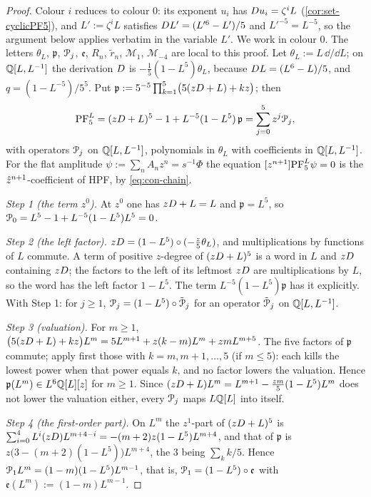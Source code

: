 \begin{proof}
Colour $i$ reduces to colour $0$: its exponent $u_i$ has $D u_i=\zeta^iL$ (\cref{cor:set-cyclicPF5}), and $L':=\zeta^iL$ satisfies $D L'=(L'^6-L')/5$ and $L'^{-5}=L^{-5}$, so the argument below applies verbatim in the variable $L'$. We work in colour $0$. The letters $\theta_L$, $\mathfrak p$, $\mathcal{P}_j$, $\mathfrak e$, $R_n$, $\tilde r_n$, $\mathcal M_1$, $\mathcal M_{-4}$ are local to this proof. Let $\theta_L:=L\,\dd/\dd L$; on $\mathbb{Q}[L,L^{-1}]$ the derivation $D$ is $-\frac15(1-L^5)\theta_L$, because $D L=(L^6-L)/5$, and $q=(1-L^{-5})/5^5$. Put $\mathfrak p:=5^{-5}\prod_{k=1}^5\bigl(5(zD+L)+kz\bigr)$; then
\begin{equation}
\label{eq:con-PL}
\mathrm{PF}_{5}^{L}=(zD+L)^5-1+L^{-5}(1-L^5)\,\mathfrak p=\sum_{j=0}^{5}z^j\mathcal{P}_j ,
\end{equation}
with operators $\mathcal{P}_j$ on $\mathbb{Q}[L,L^{-1}]$, polynomials in $\theta_L$ with coefficients in $\mathbb{Q}[L,L^{-1}]$. For the flat amplitude $\psi:=\sum_nA_nz^n=s^{-1}\Phi$ the equation $[z^{n+1}]\mathrm{PF}_{5}^{L}\psi=0$ is the $\hat{z}^{n+1}$-coefficient of HPF, by \eqref{eq:con-chain}.

\emph{Step 1 (the term $z^0$).} At $z^0$ one has $zD+L=L$ and $\mathfrak p=L^5$, so $\mathcal{P}_0=L^5-1+L^{-5}(1-L^5)L^5=0$.

\emph{Step 2 (the left factor).} $zD=(1-L^5)\circ(-\tfrac z5\theta_L)$, and multiplications by functions of $L$ commute. A term of positive $z$-degree of $(zD+L)^5$ is a word in $L$ and $zD$ containing $zD$; the factors to the left of its leftmost $zD$ are multiplications by $L$, so the word has the left factor $1-L^5$. The term $L^{-5}(1-L^5)\mathfrak p$ has it explicitly. With Step 1: for $j\geq1$, $\mathcal{P}_j=(1-L^5)\circ\tilde{\mathcal{P}}_j$ for an operator $\tilde{\mathcal{P}}_j$ on $\mathbb{Q}[L,L^{-1}]$.

\emph{Step 3 (valuation).} For $m\geq1$, $\bigl(5(zD+L)+kz\bigr)L^m=5L^{m+1}+z(k-m)L^m+zmL^{m+5}$. The five factors of $\mathfrak p$ commute; apply first those with $k=m,m+1,\dots,5$ (if $m\leq5$): each kills the lowest power when that power equals $k$, and no factor lowers the valuation. Hence $\mathfrak p(L^m)\in L^6\mathbb{Q}[L][z]$ for $m\geq1$. Since $(zD+L)L^m=L^{m+1}-\frac{zm}5(1-L^5)L^m$ does not lower the valuation either, every $\mathcal{P}_j$ maps $L\mathbb{Q}[L]$ into itself.

\emph{Step 4 (the first-order part).} On $L^m$ the $z^1$-part of $(zD+L)^5$ is $\sum_{i=0}^4L^i(zD)L^{m+4-i}=-(m+2)z(1-L^5)L^{m+4}$, and that of $\mathfrak p$ is $z\bigl(3-(m+2)(1-L^5)\bigr)L^{m+4}$, the $3$ being $\sum_kk/5$. Hence $\mathcal{P}_1L^m=(1-m)(1-L^5)L^{m-1}$, that is, $\mathcal{P}_1=(1-L^5)\circ\mathfrak e$ with $\mathfrak e(L^m):=(1-m)L^{m-1}$.


\end{proof}
